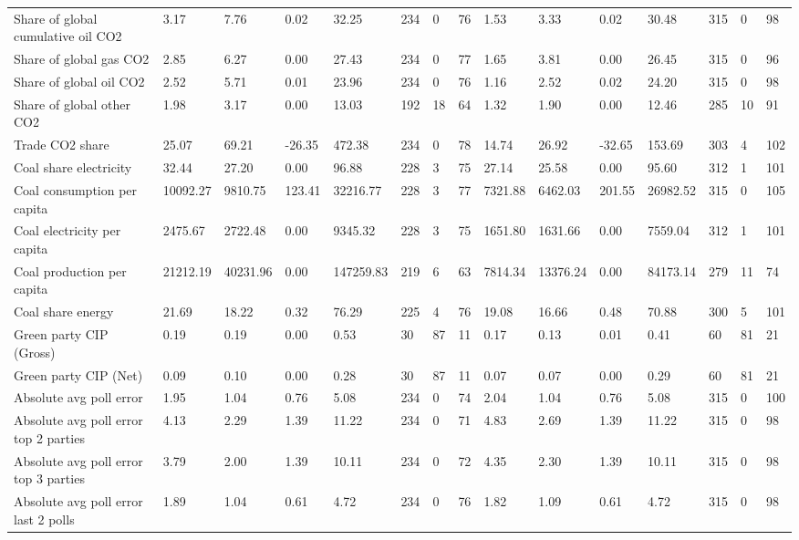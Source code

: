 \begin{longtable}{lllllllllllllll}
Share of global cumulative oil CO2 & 3.17 & 7.76 & 0.02 & 32.25 & 234 & 0 & 76 & 1.53 & 3.33 & 0.02 & 30.48 & 315 & 0 & 98\\
\addlinespace
Share of global gas CO2 & 2.85 & 6.27 & 0.00 & 27.43 & 234 & 0 & 77 & 1.65 & 3.81 & 0.00 & 26.45 & 315 & 0 & 96\\
Share of global oil CO2 & 2.52 & 5.71 & 0.01 & 23.96 & 234 & 0 & 76 & 1.16 & 2.52 & 0.02 & 24.20 & 315 & 0 & 98\\
Share of global other CO2 & 1.98 & 3.17 & 0.00 & 13.03 & 192 & 18 & 64 & 1.32 & 1.90 & 0.00 & 12.46 & 285 & 10 & 91\\
Trade CO2 share & 25.07 & 69.21 & -26.35 & 472.38 & 234 & 0 & 78 & 14.74 & 26.92 & -32.65 & 153.69 & 303 & 4 & 102\\
Coal share electricity & 32.44 & 27.20 & 0.00 & 96.88 & 228 & 3 & 75 & 27.14 & 25.58 & 0.00 & 95.60 & 312 & 1 & 101\\
\addlinespace
Coal consumption per capita & 10092.27 & 9810.75 & 123.41 & 32216.77 & 228 & 3 & 77 & 7321.88 & 6462.03 & 201.55 & 26982.52 & 315 & 0 & 105\\
Coal electricity per capita & 2475.67 & 2722.48 & 0.00 & 9345.32 & 228 & 3 & 75 & 1651.80 & 1631.66 & 0.00 & 7559.04 & 312 & 1 & 101\\
Coal production per capita & 21212.19 & 40231.96 & 0.00 & 147259.83 & 219 & 6 & 63 & 7814.34 & 13376.24 & 0.00 & 84173.14 & 279 & 11 & 74\\
Coal share energy & 21.69 & 18.22 & 0.32 & 76.29 & 225 & 4 & 76 & 19.08 & 16.66 & 0.48 & 70.88 & 300 & 5 & 101\\
Green party CIP (Gross) & 0.19 & 0.19 & 0.00 & 0.53 & 30 & 87 & 11 & 0.17 & 0.13 & 0.01 & 0.41 & 60 & 81 & 21\\
\addlinespace
Green party CIP (Net) & 0.09 & 0.10 & 0.00 & 0.28 & 30 & 87 & 11 & 0.07 & 0.07 & 0.00 & 0.29 & 60 & 81 & 21\\
Absolute avg poll error & 1.95 & 1.04 & 0.76 & 5.08 & 234 & 0 & 74 & 2.04 & 1.04 & 0.76 & 5.08 & 315 & 0 & 100\\
Absolute avg poll error top 2 parties & 4.13 & 2.29 & 1.39 & 11.22 & 234 & 0 & 71 & 4.83 & 2.69 & 1.39 & 11.22 & 315 & 0 & 98\\
Absolute avg poll error top 3 parties & 3.79 & 2.00 & 1.39 & 10.11 & 234 & 0 & 72 & 4.35 & 2.30 & 1.39 & 10.11 & 315 & 0 & 98\\
Absolute avg poll error last 2 polls & 1.89 & 1.04 & 0.61 & 4.72 & 234 & 0 & 76 & 1.82 & 1.09 & 0.61 & 4.72 & 315 & 0 & 98\\

\end{longtable}
